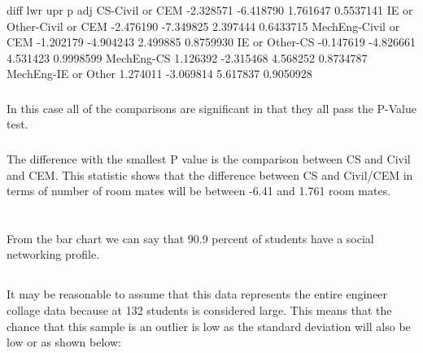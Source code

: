\documentclass[letterpaper, onecolumn,10pt]{IEEEtran}
\begin{document}
                \subsubsection{}
                    \begin{lslisting}[sh]
                            diff       lwr      upr     p adj
CS-Civil or CEM          -2.328571 -6.418790 1.761647 0.5537141
IE or Other-Civil or CEM -2.476190 -7.349825 2.397444 0.6433715
MechEng-Civil or CEM     -1.202179 -4.904243 2.499885 0.8759930
IE or Other-CS           -0.147619 -4.826661 4.531423 0.9998599
MechEng-CS                1.126392 -2.315468 4.568252 0.8734787
MechEng-IE or Other       1.274011 -3.069814 5.617837 0.9050928
                    \end{lslisting}
                
                \subsubsection{}
                In this case all of the comparisons are significant in that they all pass the P-Value test.\\
                
                \subsubsection{}
                    The difference with the smallest P value is the comparison between CS and Civil and CEM. This statistic shows that the difference between CS and Civil/CEM in terms of number of room mates will be between -6.41 and 1.761 room mates.\\
        \section{}
            \subsection{}
            From the bar chart we can say that 90.9 percent of students have a social networking profile.\\
            \subsection{}
            It may be reasonable to assume that this data represents the entire engineer collage data because at 132 students is considered large. This means that the chance that this sample is an outlier is low as the standard deviation will also be low or as shown below:
            
\end{document}
